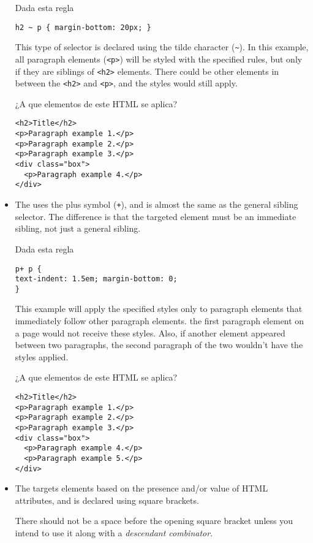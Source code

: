 \begin{exercise}
\begin{itemize}
Dada esta regla %
\begin{verbatim}
h2 ~ p { margin-bottom: 20px; }
\end{verbatim}

This type of selector is declared using the tilde character (\verb|~|). 
In this example, all paragraph elements (\verb|<p>|) 
will be styled with the specified rules, but only if they are siblings of 
\verb|<h2>| elements.
There could be other elements in between the \verb|<h2>| and 
\verb|<p>|, and the styles would still apply.

¿A que elementos de este HTML se aplica?
\begin{verbatim}
<h2>Title</h2>
<p>Paragraph example 1.</p>
<p>Paragraph example 2.</p>
<p>Paragraph example 3.</p>
<div class="box">
  <p>Paragraph example 4.</p>
</div>
\end{verbatim}
\item 
The  uses the plus symbol (\verb|+|), 
and is almost the same as the general sibling selector. 
The difference is that the targeted element must be an immediate sibling, not just a general sibling. 

Dada esta regla 
\begin{verbatim}
p+ p {
text-indent: 1.5em; margin-bottom: 0;
}
\end{verbatim}
This example will apply the specified styles
only to paragraph elements that immediately follow other paragraph elements.
the first paragraph element on a page would not receive these styles.
Also, if another element appeared between two paragraphs, the second paragraph of the two wouldn't have the styles applied.

¿A que elementos de este HTML se aplica?
\begin{verbatim}
<h2>Title</h2>
<p>Paragraph example 1.</p>
<p>Paragraph example 2.</p>
<p>Paragraph example 3.</p>
<div class="box">
  <p>Paragraph example 4.</p>
  <p>Paragraph example 5.</p>
</div>
\end{verbatim}
\item The  
targets elements based on the presence and/or value of HTML attributes, and is declared using square brackets.

There should not be a space before the opening square bracket unless you intend to use it along with a {\it descendant combinator}. 



\end{itemize}
\end{exercise}
